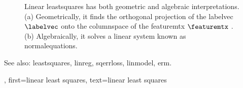 {{\begin{figure}[H]
 		\caption{Linear \gls{leastsquares} has both geometric and algebraic interpretations. 
 			(a) Geometrically, it finds the orthogonal \gls{projection} of the 
 			\gls{labelvec} $\labelvec$ onto the \gls{columnspace} of the 
 			\gls{featuremtx} $\featuremtx$ \cite[Ch. 8]{BoydConvexBook}. (b) Algebraically, it solves a linear system 
 			known as \gls{normalequations}. 
 			\label{fig_linleastsquares_dict}}
 		\end{figure}
		See also: \gls{leastsquares}, \gls{linreg}, \gls{sqerrloss}, \gls{linmodel}, \gls{erm}.},
	first={linear least squares},
	text={linear least squares}
}

